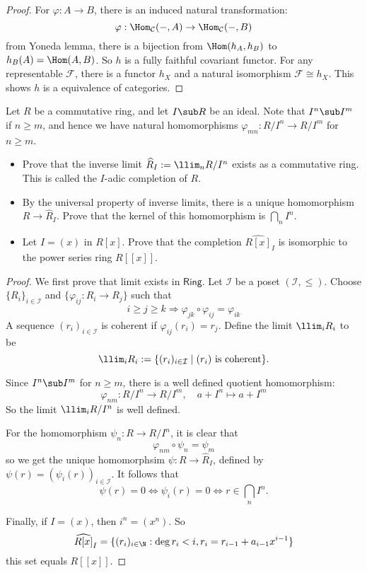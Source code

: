 \begin{proof}
For $\varphi:A\to B$, there is an induced natural transformation:
\[\varphi:\Hom_{\mathcal{C}}(-,A)\to\Hom_{\mathcal{C}}(-,B)\]
from Yoneda lemma, there is a bijection from $\Hom(h_A,h_B)$ to $h_B(A)=\Hom(A,B)$. So $h$ is a fully faithful covariant functor. For any representable $\mathscr{F}$, there is a functor $h_X$ and a natural isomorphism $\mathscr{F}\cong h_X$. This shows $h$ is a equivalence of categories. 
\end{proof}
\begin{exercise}\label{adic comple}
Let $R$ be a commutative ring, and let $I\sub R$ be an ideal. Note that $I^n\sub I^m$ if $n\geq m$, and hence we have natural homomorphisms $\varphi_{mn}:R/I^n\to R/I^m$ for $n\geq m$.
\begin{itemize}
\item Prove that the inverse limit $\widehat{R}_I:=\llim_nR/I^n$ exists as a commutative ring. This
is called the $I$-adic completion of $R$.
\item By the universal property of inverse limits, there is a unique homomorphism $R\to\widehat{R}_I$. Prove that the kernel of this homomorphism is $\bigcap_nI^n$.
\item Let $I=(x)$ in $R[x]$. Prove that the completion $\widehat{R[x]}_I$ is isomorphic to the power series ring $R[[x]]$.
\end{itemize}
\end{exercise}
\begin{proof}
We first prove that limit exists in $\mathsf{Ring}$. Let $\mathcal{I}$ be a poset $(\mathcal{I},\leq)$. Choose $\{R_i\}_{i\in\mathcal{I}}$ and $\{\varphi_{ij}:R_i\to R_j\}$ such that
\[i\geq j\geq k\Rightarrow\varphi_{jk}\circ\varphi_{ij}=\varphi_{ik}\]
A sequence $(r_i)_{i\in\mathcal{I}}$ is coherent if $\varphi_{ij}(r_i)=r_j$. Define the limit $\llim_{i}R_i$ to be
\[\llim_iR_i:=\{(r_i)_{i\in\mathcal{I}}\mid (r_i)\text{ is coherent}\}.\]

Since $I^n\sub I^m$ for $n\geq m$, there is a well defined quotient homomorphism:
\[\varphi_{nm}:R/I^n\to R/I^m,\quad a+I^n\mapsto a+I^m\]
So the limit $\llim_iR/I^n$ is well defined.\par
For the homomorphism $\psi_n:R\to R/I^n$, it is clear that
\[\varphi_{nm}\circ\psi_n=\psi_m\]
so we get the unique homomorphsim $\psi:R\to\widehat{R}_I$, defined by $\psi(r)=(\psi_i(r))_{i\in\mathcal{I}}$. It follows that
\[\psi(r)=0\iff \psi_i(r)=0\iff r\in\bigcap_nI^n.\]

Finally, if $I=(x)$, then $i^n=(x^n)$. So 
\[\widehat{R[x]}_I=\{(r_i)_{i\in\N}:\deg r_i<i,r_i=r_{i-1}+a_{i-1}x^{i-1}\}\]
this set equals $R[[x]]$.
\end{proof}
